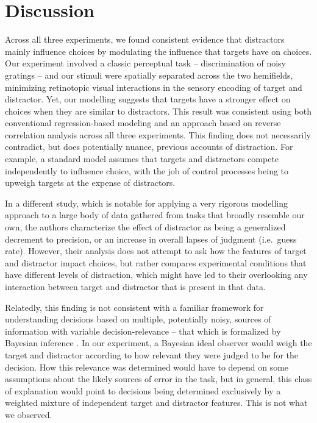 \documentclass[a4paper, nobind]{templates/ociamthesis}
\begin{document}
\hypertarget{discussion-1}{%
\section{Discussion}\label{discussion-1}}

Across all three experiments, we found consistent evidence that distractors mainly influence choices by modulating the influence that targets have on choices. Our experiment involved a classic perceptual task -- discrimination of noisy gratings -- and our stimuli were spatially separated across the two hemifields, minimizing retinotopic visual interactions in the sensory encoding of target and distractor. Yet, our modelling suggests that targets have a stronger effect on choices when they are similar to distractors. This result was consistent using both conventional regression-based modeling and an approach based on reverse correlation analysis across all three experiments. This finding does not necessarily contradict, but does potentially nuance, previous accounts of distraction. For example, a standard model assumes that targets and distractors compete independently to influence choice, with the job of control processes being to upweigh targets at the expense of distractors.

In a different study, which is notable for applying a very rigorous modelling approach to a large body of data gathered from tasks that broadly resemble our own, the authors \autocite{shen2019} characterize the effect of distractor as being a generalized decrement to precision, or an increase in overall lapses of judgment (i.e.~guess rate). However, their analysis does not attempt to ask how the features of target and distractor impact choices, but rather compares experimental conditions that have different levels of distraction, which might have led to their overlooking any interaction between target and distractor that is present in that data.

Relatedly, this finding is not consistent with a familiar framework for understanding decisions based on multiple, potentially noisy, sources of information with variable decision-relevance -- that which is formalized by Bayesian inference \autocite{dayan1999,eckstein2009}. In our experiment, a Bayesian ideal observer would weigh the target and distractor according to how relevant they were judged to be for the decision. How this relevance was determined would have to depend on some assumptions about the likely sources of error in the task, but in general, this class of explanation would point to decisions being determined exclusively by a weighted mixture of independent target and distractor features. This is not what we observed.
\end{document}
